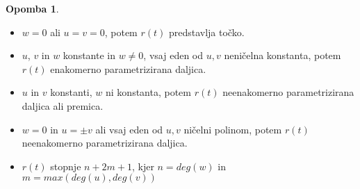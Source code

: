 \documentclass[12pt]{beamer}
\theoremstyle{definition} %
\newtheorem{opomba}[definicija]{Opomba}
\theoremstyle{plain} %
\begin{document}
\begin{frame}
    \begin{opomba}
        \begin{itemize}
            \item  $w=0$ ali $u=v=0$, potem $r(t)$ predstavlja točko.
            \item $u$, $v$ in $w$ konstante in $w \neq 0$, vsaj eden od $u, v$ neničelna konstanta,
            potem $r(t)$ enakomerno parametrizirana daljica.
            \item $u$ in $v$ konstanti, $w$  ni konstanta, potem $r(t)$ neenakomerno parametrizirana daljica ali premica.
            \item $w = 0$ in $u = \pm v$ ali vsaj eden od $u, v$ ničelni polinom, 
            potem $r(t)$ neenakomerno parametrizirana daljica.
            \item $r(t)$ stopnje $n + 2m + 1$, kjer $n = deg(w)$ in $m = max(deg(u),deg(v))$
        \end{itemize} 
    \end{opomba}
      
\end{frame}


\end{document}
